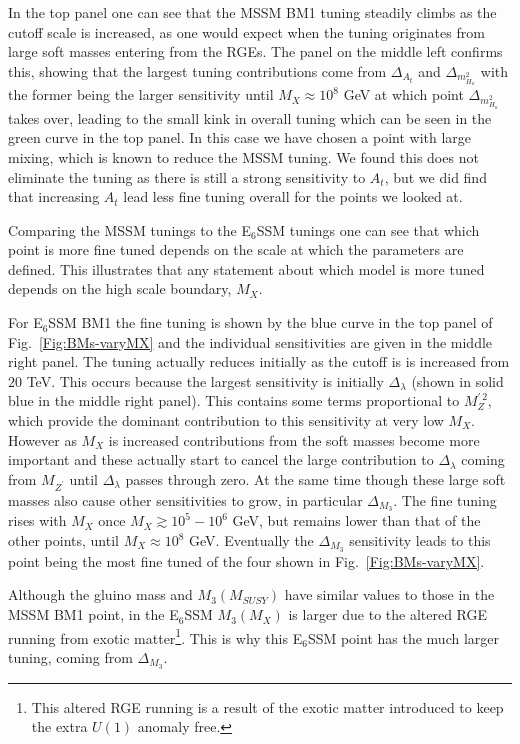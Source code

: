 \documentclass[preprint,amsmath,amssymb,aps,superscriptaddress,prd,showpacs,floatfix,nofootinbib]{revtex4-1}
\begin{document}
In the top panel one can see that the MSSM BM1 tuning 
steadily climbs as the cutoff scale is increased, as one would expect
when the tuning originates from large soft masses entering from the
RGEs. The panel on the middle left confirms this, showing that the
largest tuning contributions come from $\Delta_{A_t}$ and
$\Delta_{m_{H_u}^2}$ with the former being the larger sensitivity
until $M_X\approx 10^8$ GeV at which point $\Delta_{m_{H_u}^2}$ takes
over, leading to the small kink in overall tuning which can be seen in
the green curve in the top panel. In this case we have chosen a
point with large mixing, which is known to reduce the MSSM tuning.  We
found this does not eliminate the tuning as there is still a strong
sensitivity to $A_t$, but we did find that increasing $A_t$ lead less
fine tuning overall for the points we looked at.  

Comparing the MSSM tunings to the E$_6$SSM tunings one can see that
which point is more fine tuned depends on the scale at which the
parameters are defined.  This illustrates that any statement about
which model is more tuned depends on the high scale boundary, $M_X$.

For E$_6$SSM BM1 the fine tuning is shown by the blue curve in the top
panel of Fig.~\ref{Fig:BMs-varyMX} and the individual sensitivities
are given in the middle right panel. The tuning actually reduces
initially as the cutoff is is increased from $20$ TeV.  This occurs
because the largest sensitivity is initially $\Delta_\lambda$ (shown
in solid blue in the middle right panel).  This contains some terms
proportional to $M_Z^{\prime \, 2}$, which provide the dominant
contribution to this sensitivity at very low $M_X$.  However as $M_X$
is increased contributions from the soft masses become more important
and these actually start to cancel the large contribution to
$\Delta_\lambda$ coming from $M_{Z^\prime}$ until $\Delta_\lambda$
passes through zero.  At the same time though these large soft masses
also cause other sensitivities to grow, in particular $\Delta_{M_3}$.
The fine tuning rises with $M_X$ once $M_X \gtrsim 10^5-10^6$ GeV, but
remains lower than that of the other points, until $M_X \approx 10^8$
GeV.  Eventually the $\Delta_{M_3}$ sensitivity leads to this point
being the most fine tuned of the four shown in
Fig.~\ref{Fig:BMs-varyMX}.

 Although the gluino mass and $M_3(M_{SUSY})$ have similar values to
 those in the MSSM BM1 point, in the E$_6$SSM $M_3(M_X)$ is larger
 due to the altered RGE running from exotic matter\footnote{This
   altered RGE running is a result of the exotic matter introduced to
   keep the extra $U(1)$ anomaly free. }. This is why this E$_6$SSM
 point has the much larger tuning, coming from $\Delta_{M_3}$.
\end{document}
